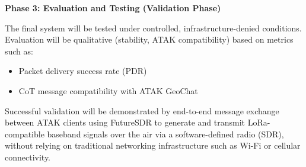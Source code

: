 \vspace{0.5em}
\noindent\textbf{Phase 3: Evaluation and Testing (Validation Phase)}\par
The final system will be tested under controlled, infrastructure-denied conditions. Evaluation will be qualitative (stability, ATAK compatibility) based on metrics such as:
\begin{itemize}
    \item Packet delivery success rate (PDR)
    \item CoT message compatibility with ATAK GeoChat
\end{itemize}
Successful validation will be demonstrated by end-to-end message exchange between ATAK clients using FutureSDR to generate and transmit LoRa-compatible baseband signals over the air via a software-defined radio (SDR), without relying on traditional networking infrastructure such as Wi-Fi or cellular connectivity.
